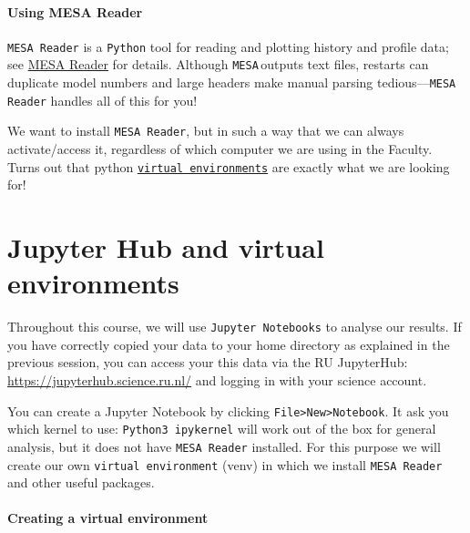 \documentclass[11pt,a4paper]{article}
\newcommand{\MESA}{\texttt{MESA}\,}
\begin{document}
\paragraph{Using MESA Reader}
\texttt{MESA Reader} is a \texttt{Python} tool for reading and plotting history and profile data; see \href{https://docs.mesastar.org/en/latest/using_mesa/output.html#plotting-mesa-output}{MESA Reader} for details. Although \MESA outputs text files, restarts can duplicate model numbers and large headers make manual parsing tedious—\texttt{MESA Reader} handles all of this for you!

We want to install \texttt{MESA Reader}, but in such a way that we can always activate/access it, regardless of which computer we are using in the Faculty. 
Turns out that python \href{https://virtualenv.pypa.io/en/latest/user_guide.html}{\texttt{virtual environments}} are exactly what we are looking for!




\section{Jupyter Hub and virtual environments}

Throughout this course, we will use \texttt{Jupyter Notebooks} to analyse our results. 
If you have correctly copied your data to your home directory as explained in the previous session, you can access your this data via the RU JupyterHub: \url{https://jupyterhub.science.ru.nl/} and logging in with your science account.

You can create a Jupyter Notebook by clicking \texttt{File>New>Notebook}. It ask you which kernel to use: \texttt{Python3 ipykernel} will work out of the box for general analysis, but it does not have \texttt{MESA Reader} installed. For this purpose we will create our own \texttt{virtual environment} (venv) in which we install \texttt{MESA Reader} and other useful packages.



\paragraph{Creating a virtual environment}
\end{document}
